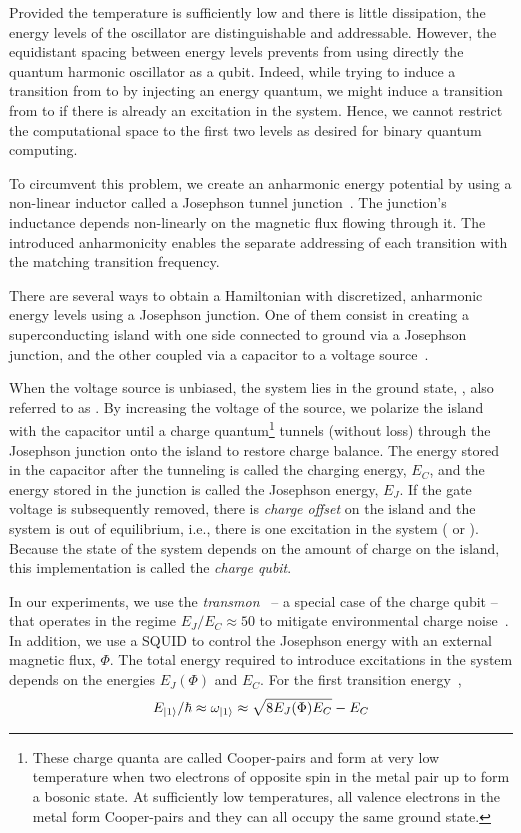 Provided the temperature is sufficiently low and there is little dissipation, the energy levels of the oscillator are distinguishable and addressable. However, the equidistant spacing between energy levels prevents from using directly the quantum harmonic oscillator as a qubit. Indeed, while trying to induce a transition from \0 to \1 by injecting an energy quantum, we might induce a transition from \1 to \2 if there is already an excitation in the system. Hence, we cannot restrict the computational space to the first two levels as desired for binary quantum computing. 

To circumvent this problem, we create an anharmonic energy potential by using a non-linear inductor called a Josephson tunnel junction~\cite{Vion2003QuantumProcessing}. The junction's inductance depends non-linearly on the magnetic flux flowing through it. The introduced anharmonicity enables the separate addressing of each transition with the  matching transition frequency. 

There are several ways to obtain a Hamiltonian with discretized, anharmonic energy levels using a Josephson junction. One of them consist in creating a superconducting island with one side connected to ground via a Josephson junction, and the other coupled via a capacitor to a voltage source~\cite{Bouchiat1998QuantumPair, Nakamura1999CoherentBox}. 

When the voltage source is unbiased, the system lies in the ground state, \0, also referred to as \g. By increasing the voltage of the source, we polarize the island with the capacitor until a charge quantum\footnote{These charge quanta are called Cooper-pairs and form at very low temperature when two electrons of opposite spin in the metal pair up to form a bosonic state. At sufficiently low temperatures, all valence electrons in the metal form Cooper-pairs and they can all occupy the same ground state.} tunnels (without loss) through the Josephson junction onto the island to restore charge balance. The energy stored in the capacitor after the tunneling is called the charging energy, $E_C$, and the energy stored in the junction is called the Josephson energy, $E_J$. 
If the gate voltage is subsequently removed, there is \textit{charge offset} on the island and the system is out of equilibrium, i.e., there is one excitation in the system (\1 or \e). Because the state of the system depends on the amount of charge on the island, this implementation is called the \textit{charge qubit}.

In our experiments, we use the \textit{transmon}~\cite{KochCharge-insensitiveBox} -- a special case of the charge qubit -- that operates in the regime $E_J/E_C \approx 50$ to mitigate environmental charge noise~\cite{KochCharge-insensitiveBox, Oliver2013MaterialsBits}. In addition, we use a SQUID to control the Josephson energy with an external magnetic flux, $\Phi$.
The total energy required to introduce excitations in the system depends on the energies $E_J(\Phi)$ and $E_C$. For the first transition energy~\cite{KochCharge-insensitiveBox},
\begin{equation} \label{eq:qubit_frequency}
    E_{\ket{1}}/\hbar \approx \omega_{\ket{1}} \approx \sqrt{8E_J(\Phi) E_C} - E_C
\end{equation}

